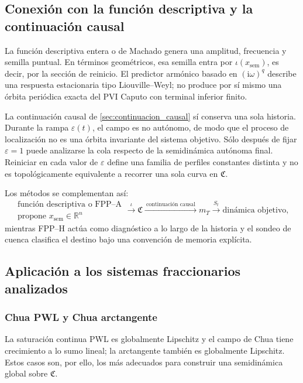\subsection{Conexión con la función descriptiva y la continuación causal}

La función descriptiva entera o de Machado genera una amplitud, frecuencia y
semilla puntual. En términos geométricos, esa semilla entra por
\(\iota(x_{\mathrm{sem}})\), es decir, por la sección de reinicio. El predictor
armónico basado en \((\mathrm i\omega)^q\) describe una respuesta estacionaria
tipo Liouville--Weyl; no produce por sí mismo una órbita periódica exacta del
PVI Caputo con terminal inferior finito.

La continuación causal de \cref{sec:continuacion_causal} sí conserva una sola
historia. Durante la rampa \(\varepsilon(t)\), el campo es no autónomo, de modo
que el proceso de localización no es una órbita invariante del sistema objetivo.
Sólo después de fijar \(\varepsilon=1\) puede analizarse la cola respecto de la
semidinámica autónoma final. Reiniciar en cada valor de \(\varepsilon\) define
una familia de perfiles constantes distinta y no es topológicamente equivalente
a recorrer una sola curva en \(\mathfrak C\).

Los métodos se complementan así:
\begin{equation}
 \begin{array}{c}
 \text{función descriptiva o FPP--A}\\[-0.1em]
 \text{propone }x_{\mathrm{sem}}\in\mathbb R^n
 \end{array}
 \xrightarrow{\ \iota\ }
 \mathfrak C
 \xrightarrow{\ \text{continuación causal}\ }
 m_T
 \xrightarrow{\ S_t\ }
 \text{dinámica objetivo},
 \label{eq:geofo-method-chain}
\end{equation}
mientras FPP--H actúa como diagnóstico a lo largo de la historia y el sondeo de
cuenca clasifica el destino bajo una convención de memoria explícita.

\subsection{Aplicación a los sistemas fraccionarios analizados}

\subsubsection{Chua PWL y Chua arctangente}

La saturación continua PWL es globalmente Lipschitz y el campo de Chua tiene
crecimiento a lo sumo lineal; la arctangente también es globalmente Lipschitz.
Estos casos son, por ello, los más adecuados para construir una semidinámica
global sobre \(\mathfrak C\).

